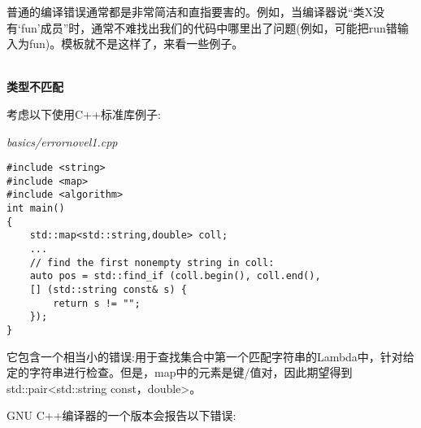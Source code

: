 普通的编译错误通常都是非常简洁和直指要害的。例如，当编译器说“类X没有‘fun’成员”时，通常不难找出我们的代码中哪里出了问题(例如，可能把run错输入为fun)。模板就不是这样了，来看一些例子。

\hspace*{\fill} \\ %
\noindent
\textbf{类型不匹配}

考虑以下使用C++标准库例子:

\noindent
\textit{basics/errornovel1.cpp}
\begin{lstlisting}[style=styleCXX]
#include <string>
#include <map>
#include <algorithm>
int main()
{
	std::map<std::string,double> coll;
	...
	// find the first nonempty string in coll:
	auto pos = std::find_if (coll.begin(), coll.end(),
	[] (std::string const& s) {
		return s != "";
	});
}
\end{lstlisting}

它包含一个相当小的错误:用于查找集合中第一个匹配字符串的Lambda中，针对给定的字符串进行检查。但是，map中的元素是键/值对，因此期望得到std::pair<std::string const，double>。

GNU C++编译器的一个版本会报告以下错误:

